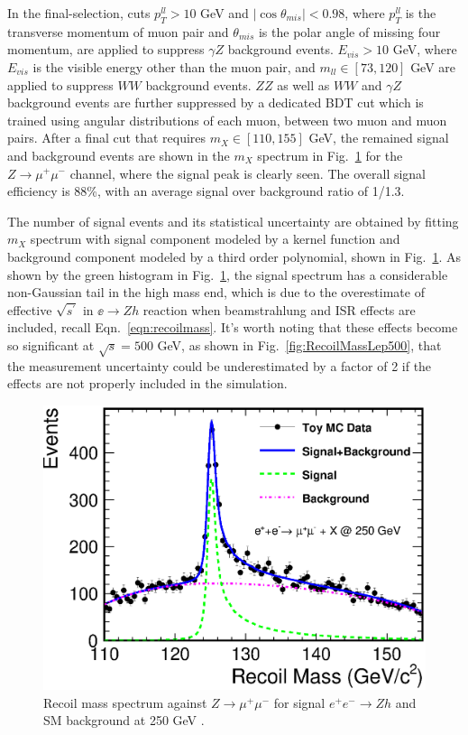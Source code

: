In the final-selection, cuts $p_T^{ll}>10$ GeV and $|\cos\theta_{mis}|<0.98$,
where $p_T^{ll}$ is the transverse momentum of muon pair and $\theta_{mis}$
is the polar angle of missing four momentum, are applied to suppress
$\gamma Z$ background events. $E_{vis}>10$ GeV,
where $E_{vis}$ is the visible energy other than the muon pair,
and $m_{ll}\in[73,120]$ GeV
are applied to suppress $WW$ background events. 
$ZZ$ as well as $WW$ and $\gamma Z$ background events are
further suppressed by a dedicated BDT cut 
which is trained using angular distributions of each muon,
between two muon and muon pairs. After a final cut that requires
$m_X\in[110, 155]$ GeV, the remained signal and background events are 
shown in the $m_X$ spectrum in Fig.~\ref{fig:RecoilMassLep250} 
for the $Z\to\mu^+\mu^-$ channel, where the signal peak is clearly seen.
The overall signal efficiency is 88\%, with an
average signal over background ratio of 1/1.3.

The number of signal events and its statistical uncertainty are obtained by 
fitting $m_X$ spectrum with signal component modeled by a kernel function
and background component modeled by a third order polynomial, 
shown in Fig.~\ref{fig:RecoilMassLep250}. As shown by the green histogram in Fig.~\ref{fig:RecoilMassLep250},
the signal spectrum has a 
considerable non-Gaussian tail in the high mass end, which is due to
the overestimate of effective $\sqrt{s^\prime}$ in $\ee\to Zh$ reaction 
when beamstrahlung and ISR effects are included, recall Eqn.~\ref{eqn:recoilmass}.
It's worth noting that these effects become so significant at $\sqrt{s}=500$ GeV,
as shown in Fig.~\ref{fig:RecoilMassLep500},
that the measurement uncertainty could be underestimated by a factor of 2
if the effects are not properly included in the simulation. 

\begin{figure}
\begin{center}
\includegraphics[width=0.85\hsize]{chapters/figures/RecoilMassLep250.eps}
\end{center}
  \caption{Recoil mass spectrum against
 $Z\to\mu^+\mu^-$ for signal $e^+e^-\to Zh$ and SM background 
  at 250 GeV \cite{Yan:2016xyx}.}
  \label{fig:RecoilMassLep250}
\end{figure}

